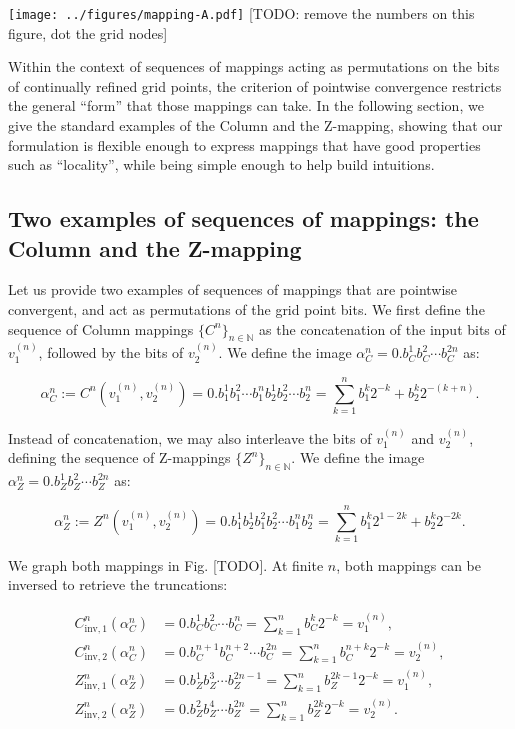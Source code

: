 \documentclass[10pt,letterpaper]{article}
\begin{document}
\texttt{[image: ../figures/mapping-A.pdf]}
[TODO: remove the numbers on this figure, dot the grid nodes]
\endif

Within the context of sequences of mappings acting as permutations on the bits of continually refined grid points, the criterion of pointwise convergence restricts the general ``form'' that those mappings can take.
In the following section, we give the standard examples of the Column and the Z-mapping, showing that our formulation is flexible enough to express mappings that have good properties such as ``locality'', while being simple enough to help build intuitions.


\subsection{Two examples of sequences of mappings: the Column and the Z-mapping} \label{sec:mapping-examples}

Let us provide two examples of sequences of mappings that are pointwise convergent, and act as permutations of the grid point bits.
We first define the sequence of Column mappings $\{C^n\}_{n\in\mathbb N}$ as the concatenation of the input bits of $v_1^{(n)}$, followed by the bits of $v_2^{(n)}$. We define the image $\alpha_C^n = 0.b_C^1 b_C^2 \cdots b_C^{2n}$ as:

\begin{equation} \label{eq:def-column-mapping}
\alpha_C^n := C^n(v_1^{(n)}, v_2^{(n)}) = 0.b_1^1 b_1^2 \cdots b_1^n b_2^1 b_2^2 \cdots b_2^n = \sum_{k=1}^n b_1^k 2^{-k} + b_2^k 2^{-(k+n)}.
\end{equation}

Instead of concatenation, we may also interleave the bits of $v_1^{(n)}$ and $v_2^{(n)}$, defining the sequence of Z-mappings $\{Z^n\}_{n\in\mathbb N}$. We define the image $\alpha_Z^n = 0.b_Z^1 b_Z^2 \cdots b_Z^{2n}$ as:

\begin{equation} \label{eq:def-z-mapping}
\alpha_Z^n := Z^n(v_1^{(n)}, v_2^{(n)}) = 0.b_1^1 b_2^1 b_1^2 b_2^2 \cdots b_1^n b_2^n = \sum_{k=1}^n b_1^k 2^{1-2k} + b_2^k 2^{-2k}.
\end{equation}

We graph both mappings in Fig. [TODO]. At finite $n$, both mappings can be inversed to retrieve the truncations:

\begin{equation} \begin{aligned}
C^n_{\textrm{inv},1}(\alpha_C^n) &= 0.b_C^1 b_C^2 \cdots b_C^n = \sum_{k=1}^n b_C^k 2^{-k} = v_1^{(n)}, \\
C^n_{\textrm{inv},2}(\alpha_C^n) &= 0.b_C^{n+1} b_C^{n+2} \cdots b_C^{2n} = \sum_{k=1}^n b_C^{n+k} 2^{-k} = v_2^{(n)}, \\
Z^n_{\textrm{inv},1}(\alpha_Z^n) &= 0.b_Z^1 b_Z^3 \cdots b_Z^{2n-1} = \sum_{k=1}^n b_Z^{2k-1} 2^{-k} = v_1^{(n)},\\
Z^n_{\textrm{inv},2}(\alpha_Z^n) &= 0.b_Z^2 b_Z^4 \cdots b_Z^{2n} = \sum_{k=1}^n b_Z^{2k} 2^{-k} = v_2^{(n)}.
\end{aligned} \end{equation}
\end{document}

